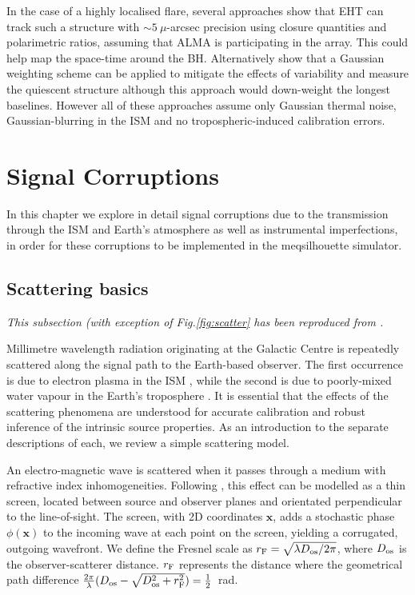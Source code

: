 In the case of a highly localised flare, several approaches \citep{Doeleman_2009, Fish_2009b, Johnson_2014} show that EHT can track such a structure with $\sim 5\ \mu$-arcsec precision using closure quantities and polarimetric ratios, assuming that ALMA is participating in the array. This could help map the space-time around the BH. Alternatively \citet{Lu_2016} show that a Gaussian weighting scheme can be applied to mitigate the effects of variability and measure the quiescent structure although this approach would down-weight the longest baselines. However all of these approaches assume only Gaussian thermal noise, Gaussian-blurring in the ISM and no tropospheric-induced calibration errors.

\section{Signal Corruptions}
In this chapter we explore in detail signal corruptions due to the transmission through the ISM and Earth's atmosphere as well as instrumental imperfections, in order for these corruptions to be implemented in the {\sc meqsilhouette} simulator. 

\subsection{Scattering basics}\label{sec:basic_scat}

{\it This subsection (with exception of Fig.\ref{fig:scatter} has been reproduced from \citet{Blecher_2016}.}

Millimetre wavelength radiation originating at the Galactic Centre is repeatedly scattered along the signal path to the Earth-based observer. The first occurrence is due to electron plasma in the ISM \citep[e.g.][]{Bower_2006,Gwinn_2014}, while the second is due to poorly-mixed water vapour in the Earth's troposphere \citep*[e.g.][]{Lay_1997,Carilli_1999}. It is essential that the effects of the scattering phenomena are understood for accurate calibration and robust inference of the intrinsic source properties. As an introduction to the separate descriptions of each, we review a simple scattering model.

An electro-magnetic wave is scattered when it passes through a medium with refractive index inhomogeneities. Following \citet{Narayan_1992}, this effect can be modelled as a thin screen, located between source and observer planes and orientated perpendicular to the line-of-sight. The screen, with 2D coordinates $\mathbf{x}$, adds a stochastic phase $\phi(\mathbf{x})$ to the incoming wave at each point on the screen, yielding a corrugated, outgoing wavefront. We define the Fresnel scale as  $r_{\rm F} = \sqrt{\lambda D_{\rm os}/2\pi}$, where $D_{\rm os}$ is the observer-scatterer distance.  $r_{\rm F}$ represents the distance where the geometrical path difference $\frac{2\pi}{\lambda} (D_{\rm os} - \sqrt{D_{\rm os}^2 + r_{\rm F}^2}) =\frac{1}{2}$~rad.

